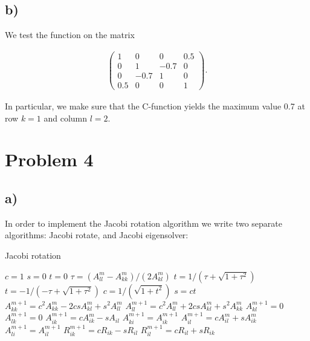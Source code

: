 \documentclass[english,notitlepage,nofootinbib]{revtex4-1}  %
\newcommand{\CC}{C\nolinebreak\hspace{-.05em}\raisebox{.4ex}{\tiny\bf +}\nolinebreak\hspace{-.10em}\raisebox{.4ex}{\tiny\bf +}}
\begin{document}
\subsection*{b)}

We test the function on the matrix

\begin{align*}
    \begin{pmatrix}
        1 & 0 & 0 & 0.5 \\
        0 & 1 & -0.7 & 0 \\
        0 & -0.7 & 1 & 0 \\
        0.5 & 0 & 0 & 1
    \end{pmatrix}.
\end{align*}

In particular, we make sure that the \CC-function yields the maximum value 0.7 at row $k=1$ and column $l=2$.

\section*{Problem 4}

\subsection*{a)}
In order to implement the Jacobi rotation algorithm we write two separate algorithms: Jacobi rotate, and Jacobi eigensolver:
\begin{algorithm}[H]
    \caption{Jacobi rotation}\label{algo:p4_jacobi_rotation}
    \begin{algorithmic}
            \State $c=1$
            \State $s=0$
            \State $t=0$
        \Else 
            \State $\tau = (A_{ll}^m-A_{kk}^m) / (2A_{kl}^m)$
                \State $t= 1/(\tau + \sqrt{1+\tau^2})$
            \Else
                \State $t = -1/(-\tau + \sqrt{1+\tau^2})$
            \EndIf
            \State $c=1/(\sqrt{1+t^2})$
            \State $s=ct$
        \EndIf
        \State $A_{kk}^{m+1} = c^2A_{kk}^m - 2csA_{kl}^m + s^2A_{ll}^m$
        \State $A_{ll}^{m+1} = c^2A_{ll}^m + 2csA_{kl}^m + s^2A_{kk}^m$
        \State $A_{kl}^{m+1} = 0$
        \State $A_{lk}^{m+1} = 0$
                \State $A_{ik}^{m+1} = cA_{ik}^m -sA_{il} $
                \State $A_{ki}^{m+1} = A_{ik}^{m+1}$
                \State $A_{il}^{m+1} = cA_{il}^m + sA_{ik}^m$
                \State $A_{li}^{m+1} = A_{il}^{m+1}$
            \EndIf
            \State $R_{ik}^{m+1} = cR_{ik} - sR_{il}$
            \State $R_{il}^{m+1} = cR_{il} + sR_{ik}$
        \EndFor
    \end{algorithmic}
\end{algorithm}
\end{document}
